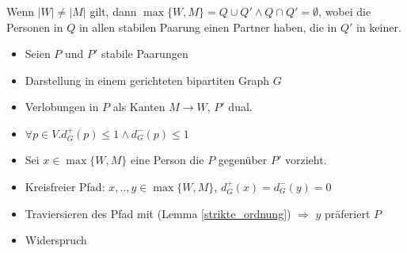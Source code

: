 \begin{frame}
  \begin{Theorem}
  \label{partner_oder_nicht_diff}
    Wenn $|W| \neq |M|$ gilt, dann $\max\{W,M\} = Q \cup Q' \land  Q \cap Q' = \emptyset$, wobei die Personen in $Q$ in allen stabilen Paarung einen Partner haben, die in $Q'$ in keiner.
  \end{Theorem}

  \begin{Beweis}
  \label{partner_oder_nicht_diff_bew}
    \begin{itemize}[<+->]
      \item Seien $P$ und $P'$ stabile Paarungen
      \item Darstellung in einem gerichteten bipartiten Graph $G$
      \item Verlobungen in $P$ als Kanten $M \rightarrow W$, $P'$ dual.
      \item $\forall p \in V. d^{+}_{G}(p) \leq 1 \land d^{-}_{G}(p) \leq 1$
      \item Sei $x \in \max\{W,M\}$ eine Person die $P$ gegenüber $P'$ vorzieht.
      \item Kreisfreier Pfad: $x,..,y \in \max\{W,M\}$, $d^{+}_{G}(x) = d^{-}_{G}(y) = 0$
      \item Traviersieren des Pfad mit (Lemma \ref{strikte_ordnung}) $\Longrightarrow$ $y$ präferiert $P$
      \item Widerspruch
    \end{itemize}
  \end{Beweis}
\end{frame}

